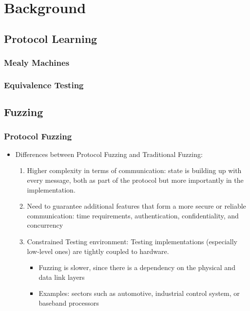 \chapter{Background}

\section{Protocol Learning}

\subsection{Mealy Machines}

\subsection{Equivalence Testing}

\section{Fuzzing}

\subsection{Protocol Fuzzing}

\begin{itemize}
  \item Differences between Protocol Fuzzing and Traditional Fuzzing:
  \begin{enumerate}
    \item Higher complexity in terms of communication: state is building up with every message, both as part of the protocol but more importantly in the implementation.
    \item Need to guarantee additional features that form a more secure or reliable communication: time requirements, authentication, confidentiality, and concurrency
    \item Constrained Testing environment: Testing implementations (especially low-level ones) are tightly coupled to hardware.
    \begin{itemize}
      \item Fuzzing is slower, since there is a dependency on the physical and data link layers
      \item Examples: sectors such as automotive, industrial control system, or baseband processors
    \end{itemize}
  \end{enumerate}
\end{itemize}
